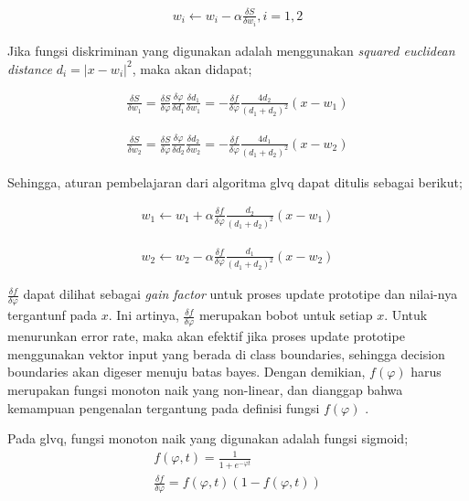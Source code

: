 \begin{align}
\label{eq:genuprule}
	w_i \leftarrow w_i - \alpha \frac{\delta S}{\delta w_i}, i = 1, 2
\end{align}


\noindent Jika fungsi diskriminan yang digunakan adalah menggunakan
\textit{squared euclidean distance} $d_i = \lvert x - w_i\rvert ^2$,  maka akan
didapat;

\begin{align}
\label{eq:turunan1a}
	\frac{\delta S}{\delta w_1} =  
	\frac{\delta S}{\delta \varphi} \frac{\delta \varphi}{\delta d_1} \frac{\delta
	d_1}{\delta w_1} =
	- \frac{\delta f}{\delta \varphi} \frac{4d_2}{(d_1 + d_2)^2} (x - w_1)
\end{align}

\begin{align}
\label{eq:turunan1b}
	\frac{\delta S}{\delta w_2} =  
	\frac{\delta S}{\delta \varphi} \frac{\delta \varphi}{\delta d_2} \frac{\delta
	d_2}{\delta w_2} =
	- \frac{\delta f}{\delta \varphi} \frac{4d_1}{(d_1 + d_2)^2} (x - w_2)
\end{align}

\noindent Sehingga, aturan pembelajaran dari algoritma \gls{glvq} dapat ditulis
sebagai berikut;

\begin{align}
\label{eq:glvq-rulea}
	w_1 \leftarrow w_1 + \alpha   
	\frac{\delta f}{\delta \varphi} \frac{d_2}{(d_1 + d_2)^2} (x - w_1)
\end{align}

\begin{align}
\label{eq:glvq-ruleb}
	w_2 \leftarrow w_2 - \alpha   
	\frac{\delta f}{\delta \varphi} \frac{d_1}{(d_1 + d_2)^2} (x - w_2)
\end{align}

$\frac{\delta f}{\delta \varphi}$ dapat dilihat sebagai \emph{gain factor} untuk
proses update prototipe dan nilai-nya tergantunf pada $x$. Ini artinya, 
$\frac{\delta f}{\delta \varphi}$ merupakan bobot untuk setiap $x$. Untuk
menurunkan error rate, maka akan efektif jika proses update prototipe
menggunakan vektor input yang berada di class boundaries, sehingga decision
boundaries akan digeser menuju batas bayes. Dengan demikian, $f(\varphi)$ harus
merupakan fungsi monoton naik yang non-linear, dan dianggap bahwa kemampuan
pengenalan tergantung pada definisi fungsi $f(\varphi)$ .

Pada \gls{glvq}, fungsi monoton naik yang digunakan adalah fungsi sigmoid;
\begin{align}
\label{eq:sigmoid}
	f(\varphi, t) = \frac{1}{1 + e^{-\varphi t}} \\
	\frac{\delta f}{\delta \varphi} = f(\varphi, t) (1 - f(\varphi , t))
\end{align} 

